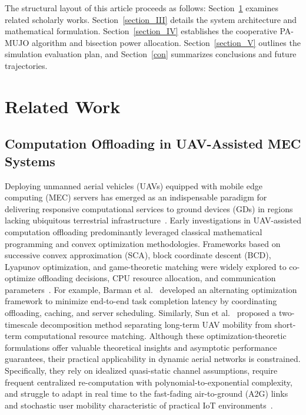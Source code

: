 \documentclass[journal]{IEEEtran}
\begin{document}
The structural layout of this article proceeds as follows: Section~\ref{sec_II} examines related scholarly works. Section~\ref{section_III} details the system architecture and mathematical formulation. Section~\ref{section_IV} establishes the cooperative PA-MUJO algorithm and bisection power allocation. Section~\ref{section_V} outlines the simulation evaluation plan, and Section~\ref{con} summarizes conclusions and future trajectories.


\section{Related Work}
\label{sec_II}

\subsection{Computation Offloading in UAV-Assisted MEC Systems}

Deploying unmanned aerial vehicles (UAVs) equipped with mobile edge computing (MEC) servers has emerged as an indispensable paradigm for delivering responsive computational services to ground devices (GDs) in regions lacking ubiquitous terrestrial infrastructure~\cite{mao2017mec, zeng2019accessing}. Early investigations in UAV-assisted computation offloading predominantly leveraged classical mathematical programming and convex optimization methodologies. Frameworks based on successive convex approximation (SCA), block coordinate descent (BCD), Lyapunov optimization, and game-theoretic matching were widely explored to co-optimize offloading decisions, CPU resource allocation, and communication parameters~\cite{barman2025joint, TJCCT}. For example, Barman et al.~\cite{barman2025joint} developed an alternating optimization framework to minimize end-to-end task completion latency by coordinating offloading, caching, and server scheduling. Similarly, Sun et al.~\cite{TJCCT} proposed a two-timescale decomposition method separating long-term UAV mobility from short-term computational resource matching. Although these optimization-theoretic formulations offer valuable theoretical insights and asymptotic performance guarantees, their practical applicability in dynamic aerial networks is constrained. Specifically, they rely on idealized quasi-static channel assumptions, require frequent centralized re-computation with polynomial-to-exponential complexity, and struggle to adapt in real time to the fast-fading air-to-ground (A2G) links and stochastic user mobility characteristic of practical IoT environments~\cite{li2026tnse}.
\end{document}

